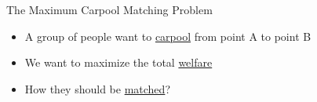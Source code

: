 \begin{frame}{The Maximum Carpool Matching Problem}
\begin{itemize}
	\item<1> A group of people want to \underline{carpool} from point A to point B
	\item<2> We want to maximize the total \underline{welfare}
	\item<3> How they should be \underline{matched}?
\end{itemize}

\centering


\end{frame}